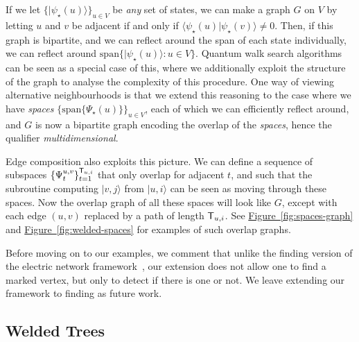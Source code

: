 \documentclass{article}
\newcommand{\fig}[1]{\hyperref[fig:#1]{Figure~\ref*{fig:#1}}}
\def\ket#1{{\lvert}#1\rangle}
\renewcommand{\>}{\rangle}
\newcommand{\<}{\langle}
\renewcommand{\(}{\left(}
\renewcommand{\)}{\right)}
\def\braket#1#2{{{\langle}#1\vert}#2\rangle}
\begin{document}
If we let $\{\ket{\psi_\star(u)}\}_{u\in V}$ be \emph{any} set of states, we can make a graph $G$ on $V$ by letting $u$ and $v$ be adjacent if and only if $\braket{\psi_\star(u)}{\psi_\star(v)}\neq 0$. Then, if this graph is bipartite, and we can reflect around the span of each state individually, we can reflect around $\mathrm{span}\{\ket{\psi_\star(u)}:u\in V\}$. Quantum walk search algorithms can be seen as a special case of this, where we additionally exploit the structure of the graph to analyse the complexity of this procedure. One way of viewing alternative neighbourhoods is that we extend this reasoning to the case where we have \emph{spaces} $\{\mathrm{span}\{\Psi_\star(u)\}\}_{u\in V}$, each of which we can efficiently reflect around, and $G$ is now a bipartite graph encoding the overlap of the \emph{spaces}, hence the qualifier \emph{multidimensional}.

Edge composition also exploits this picture. We can define a sequence of subspaces $\{\Psi_t^{u,v}\}_{t=1}^{{\sf T}_{u,i}}$ that only overlap for adjacent $t$, and such that the subroutine computing $\ket{v,j}$ from $\ket{u,i}$ can be seen as moving through these spaces. Now the overlap graph of all these spaces will look like $G$, except with each edge $(u,v)$ replaced by a path of length ${\sf T}_{u,i}$.
See \fig{spaces-graph} and \fig{welded-spaces} for examples of such overlap graphs. 


Before moving on to our examples, we comment that unlike the finding version of the electric network framework~\cite{apers2019UnifiedFrameworkQWSearch}, our extension does not allow one to find a marked vertex, but only to detect if there is one or not. We leave extending our framework to finding as future work. 

\subsection{Welded Trees}
\end{document}
